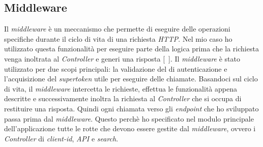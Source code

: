 \subsection{Middleware}\label{subsec:middleware}
Il \textit{middleware} è un meccanismo che permette di eseguire delle operazioni specifiche durante il ciclo di vita di una richiesta \textit{HTTP}. 
Nel mio caso ho utilizzato questa funzionalità per eseguire parte della logica prima che la richiesta venga inoltrata al \textit{Controller} e generi una risposta [~\cite{site:middleware}].
Il \textit{middleware} è stato utilizzato per due scopi principali: la validazione del  di autenticazione e l'acquisizione del \textit{supertoken} utile per eseguire delle chiamate.
Basandoci sul ciclo di vita, il \textit{middleware} intercetta le richieste, effettua le funzionalità appena descritte e successivamente inoltra la richiesta al \textit{Controller} che si occupa di restituire una risposta.
Quindi ogni chiamata verso gli \textit{endpoint} che ho sviluppato passa prima dal \textit{middleware}. Questo perchè ho specificato
nel modulo principale dell'applicazione tutte le rotte che devono essere gestite dal \textit{middleware}, ovvero i \textit{Controller} di \textit{client-id}, \textit{API} e \textit{search}.

